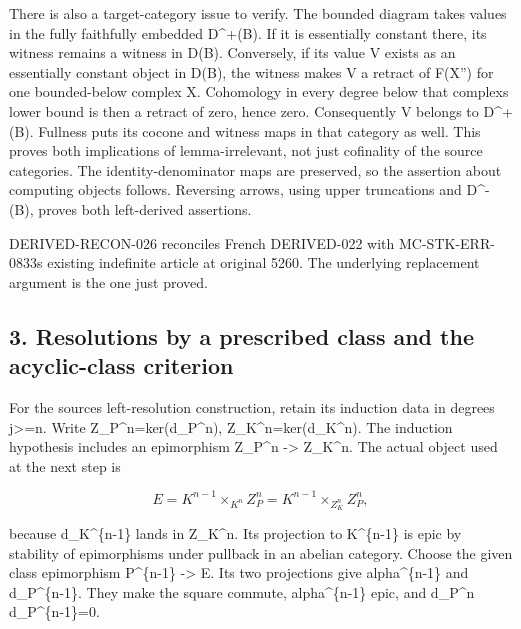 There is also a target-category issue to verify. The bounded diagram takes values in the fully faithfully embedded D\textasciicircum{}\allowbreak{}+(B)\allowbreak{}. If it is essentially constant there,\allowbreak{} its witness remains a witness in D(B)\allowbreak{}. Conversely,\allowbreak{} if its value V exists as an essentially constant object in D(B)\allowbreak{},\allowbreak{} the witness makes V a retract of F(X'')\allowbreak{} for one bounded-below complex X\textquotesingle\textquotesingle. Cohomology in every degree below that complex\textquotesingle s lower bound is then a retract of zero,\allowbreak{} hence zero. Consequently V belongs to D\textasciicircum{}\allowbreak{}+(B)\allowbreak{}. Fullness puts its cocone and witness maps in that category as well. This proves both implications of lemma-irrelevant,\allowbreak{} not just cofinality of the source categories. The identity-denominator maps are preserved,\allowbreak{} so the assertion about computing objects follows. Reversing arrows,\allowbreak{} using upper truncations and D\textasciicircum{}-(B)\allowbreak{},\allowbreak{} proves both left-derived assertions.

DERIVED-RECON-026 reconciles French DERIVED-022 with MC-STK-ERR-0833\textquotesingle s existing indefinite article at original 5260. The underlying replacement argument is the one just proved.

\subsection{3. Resolutions by a prescribed class and the acyclic-class criterion}\label{proofs-5091-5900-resolutions-by-a-prescribed-class-and-the-acyclic-class-criterion}

For the source\textquotesingle s left-resolution construction,\allowbreak{} retain its induction data in degrees j>\allowbreak{}=n. Write Z\_\allowbreak{}P\textasciicircum{}n\allowbreak{}=ker(d\_\allowbreak{}P\textasciicircum{}n)\allowbreak{},\allowbreak{} Z\_\allowbreak{}K\textasciicircum{}n\allowbreak{}=ker(d\_\allowbreak{}K\textasciicircum{}n)\allowbreak{}. The induction hypothesis includes an epimorphism Z\_\allowbreak{}P\textasciicircum{}n \allowbreak{}-> Z\_\allowbreak{}K\textasciicircum{}n. The actual object used at the next step is

\[
 E=K^{n-1}\mathbin{\times}_{K^n}Z_P^n
  =K^{n-1}\mathbin{\times}_{Z_K^n}Z_P^n,                 \tag{3.1}
\]

because d\_\allowbreak{}K\textasciicircum{}\{n-1\} lands in Z\_\allowbreak{}K\textasciicircum{}n. Its projection to K\^{}\{n-1\} is epic by stability of epimorphisms under pullback in an abelian category. Choose the given class epimorphism P\^{}\{n-1\} \allowbreak{}-> E. Its two projections give alpha\^{}\{n-1\} and d\_\allowbreak{}P\textasciicircum{}\{n-1\}. They make the square commute,\allowbreak{} alpha\^{}\{n-1\} epic,\allowbreak{} and d\_\allowbreak{}P\textasciicircum{}n d\_\allowbreak{}P\textasciicircum{}\{n-1\}\allowbreak{}=0.

